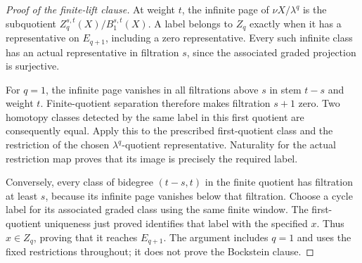 \begin{proof}[Proof of the finite-lift clause]
At weight $t$, the infinite page of $\nu X/\lambda^q$ is the
subquotient $Z_q^{s,t}(X)/B_1^{s,t}(X)$. A label belongs to $Z_q$
exactly when it has a representative on $E_{q+1}$, including a zero
representative. Every such infinite class has an actual representative
in filtration $s$, since the associated graded projection is surjective.

For $q=1$, the infinite page vanishes in all filtrations above $s$
in stem $t-s$ and weight $t$. Finite-quotient separation therefore
makes filtration $s+1$ zero. Two homotopy classes detected by the same
label in this first quotient are consequently equal. Apply this to
the prescribed first-quotient class and the restriction of the chosen
$\lambda^q$-quotient representative. Naturality for the actual
restriction map proves that its image is precisely the required label.

Conversely, every class of bidegree $(t-s,t)$ in the finite quotient
has filtration at least $s$, because its infinite page vanishes below
that filtration. Choose a cycle label for its associated graded class
using the same finite window. The first-quotient uniqueness just proved
identifies that label with the specified $x$. Thus $x\in Z_q$, proving
that it reaches $E_{q+1}$. The argument includes $q=1$ and uses the
fixed restrictions throughout; it does not prove the Bockstein clause.
\end{proof}

